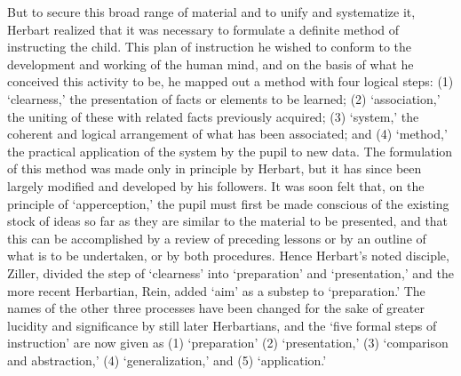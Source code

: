 \documentclass[
]{book}
\begin{document}
But to secure this broad range of material and to unify and systematize it, Herbart realized that it was necessary to formulate a definite method of instructing the child. This plan of instruction he wished to conform to the development and working of the human mind, and on the basis of what he conceived this activity to be, he mapped out a method with four logical steps: (1) `clearness,' the presentation of facts or elements to be learned; (2) `association,' the uniting of these with related facts previously acquired; (3) `system,' the coherent and logical arrangement of what has been associated; and (4) `method,' the practical application of the system by the pupil to new data. The formulation of this method was made only in principle by Herbart, but it has since been largely modified and developed by his followers. It was soon felt that, on the principle of `apperception,' the pupil must first be made conscious of the existing stock of ideas so far as they are similar to the material to be presented, and that this can be accomplished by a review of preceding lessons or by an outline of what is to be undertaken, or by both procedures. Hence Herbart's noted disciple, Ziller, divided the step of `clearness' into `preparation' and `presentation,' and the more recent Herbartian, Rein, added `aim' as a substep to `preparation.' The names of the other three processes have been changed for the sake of greater lucidity and significance by still later Herbartians, and the `five formal steps of instruction' are now given as (1) `preparation' (2) `presentation,' (3) `comparison and abstraction,' (4) `generalization,' and (5) `application.'
\end{document}
